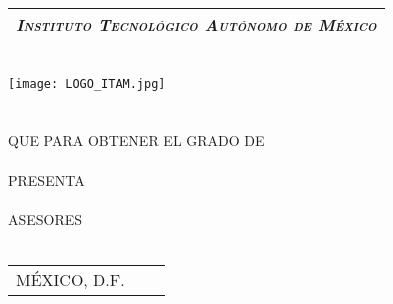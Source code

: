 \thispagestyle{empty}
\begin{titlepage}

	\begin{center}
	\vspace{70pt}
		\begin{tabular}{c}
			\Large \emph{\textsc{Instituto Tecnológico Autónomo de México}}\\
			\hline
		\end{tabular}\\
		\vspace{25pt}
		\texttt{[image: LOGO\_ITAM.jpg]}\\
		\vspace{25pt}
		\begingroup
			\fontsize{14pt}{12pt}\selectfont
			{\huge \thetitle}\\
			\vspace{5pt}
			\vspace{20 pt}
			{\Large \thethesis } \\
			\vspace{5pt}
			QUE PARA OBTENER EL GRADO DE \\
			\vspace{5pt}
			{\Large \thedegree} \\
			\vspace{5pt}
			PRESENTA \\
			\vspace{5pt}
			{\Large \theauthor} \\
			\vfill
			ASESORES \\
			{\Large \theadvisor} \\
			\vspace{5pt}
			\begin{tabular}{lcr}
				MÉXICO, D.F. & \hspace{60pt} & \theyear
			\end{tabular}
		\endgroup
	\end{center}
\end{titlepage}
